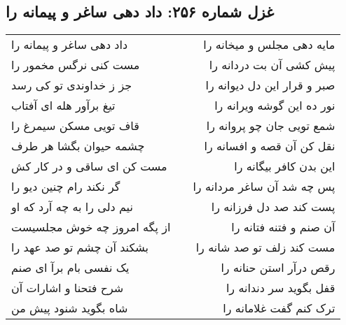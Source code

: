 \begin{center}
\section*{غزل شماره ۲۵۶: داد دهی ساغر و پیمانه را}
\label{sec:0256}
\begin{longtable}{l p{0.5cm} r}
داد دهی ساغر و پیمانه را
&&
مایه دهی مجلس و میخانه را
\\
مست کنی نرگس مخمور را
&&
پیش کشی آن بت دردانه را
\\
جز ز خداوندی تو کی رسد
&&
صبر و قرار این دل دیوانه را
\\
تیغ برآور هله ای آفتاب
&&
نور ده این گوشه ویرانه را
\\
قاف تویی مسکن سیمرغ را
&&
شمع تویی جان چو پروانه را
\\
چشمه حیوان بگشا هر طرف
&&
نقل کن آن قصه و افسانه را
\\
مست کن ای ساقی و در کار کش
&&
این بدن کافر بیگانه را
\\
گر نکند رام چنین دیو را
&&
پس چه شد آن ساغر مردانه را
\\
نیم دلی را به چه آرد که او
&&
پست کند صد دل فرزانه را
\\
از پگه امروز چه خوش مجلسیست
&&
آن صنم و فتنه فتانه را
\\
بشکند آن چشم تو صد عهد را
&&
مست کند زلف تو صد شانه را
\\
یک نفسی بام برآ ای صنم
&&
رقص درآر استن حنانه را
\\
شرح فتحنا و اشارات آن
&&
قفل بگوید سر دندانه را
\\
شاه بگوید شنود پیش من
&&
ترک کنم گفت غلامانه را
\\
\end{longtable}
\end{center}
